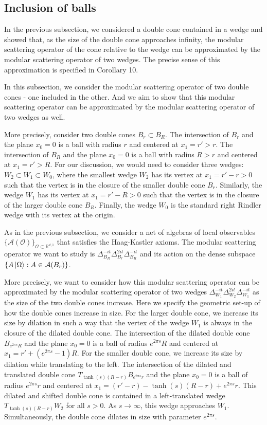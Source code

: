 \documentclass[a4paper,11pt]{article}
\theoremstyle{definition}
\begin{document}
\subsection{Inclusion of balls}\label{subsection:ballinball}
In the previous subsection, we considered a double cone contained in a wedge and showed that, as the size of the double cone approaches infinity, the modular scattering operator of the cone relative to the wedge can be approximated by the modular scattering operator of two wedges. The precise sense of this approximation is specified in Corollary 10. 

In this subsection, we consider the modular scattering operator of two double cones - one included in the other. And we aim to show that this modular scattering operator can be approximated by the modular scattering operator of two wedges as well. 

More precisely, consider two double cones $B_r \subset B_R$. The intersection of $B_r$ and the plane $x_0 = 0$ is a ball with radius $r$ and centered at $x_1 = r' > r$. The intersection of $B_R$ and the plane $x_0 = 0$ is a ball with radius $R > r$ and centered at $x_1 = r' > R$. For our discussion, we would need to consider three wedges: $W_2\subset W_1\subset W_0$, where the smallest wedge $W_2$ has its vertex at $x_1 = r' - r > 0$ such that the vertex is in the closure of the smaller double cone $B_r$. Similarly, the wedge $W_1$ has its vertex at $x_1 = r' - R > 0$ such that the vertex is in the closure of the larger double cone $B_R$. Finally, the wedge $W_0$ is the standard right Rindler wedge with its vertex at the origin. 

As in the previous subsection, we consider a net of algebras of local observables $\{\mathcal{A}(\mathcal{O})\}_{\mathcal{O}\subset\mathbb{R}^{d,1}}$ that satisfies the Haag-Kastler axioms. The modular scattering operator we want to study is $\Delta_{B_R}^{-it}\Delta_{B_r}^{2it}\Delta_{B_R}^{-it}$ and its action on the dense subspace $\{A\ket{\Omega}: A\in\mathcal{A}(B_r)\}$.

More precisely, we want to consider how this modular scattering operator can be approximated by the modular scattering operator of two wedges $\Delta_{W_1}^{-it}\Delta_{W_2}^{2it}\Delta_{W_1}^{-it}$ as the size of the two double cones increase. Here we specify the geometric set-up of how the double cones increase in size. For the larger double cone, we increase its size by dilation in such a way that the vertex of the wedge $W_1$ is always in the closure of the dilated double cone. The intersection of the dilated double cone $B_{e^{2\pi s}R}$ and the plane $x_0 = 0$ is a ball of radius $e^{2\pi s}R$ and centered at $x_1 = r' + (e^{2\pi s} - 1)R$. For the smaller double cone, we increase its size by dilation while translating to the left. The intersection of the dilated and translated double cone $T_{\tanh(s)(R - r)}B_{e^{2\pi s}r}$ and the plane $x_0 = 0$ is a ball of radius $e^{2\pi s}r$ and centered at $x_1 = (r' - r) - \tanh(s)(R - r) + e^{2\pi s}r$. This dilated and shifted double cone is contained in a left-translated wedge $T_{\tanh(s)(R - r)}W_2$ for all $s > 0$. As $s\rightarrow\infty$, this wedge approaches $W_1$. Simultaneously, the double cone dilates in size with parameter $e^{2\pi s}$.
\end{document}
